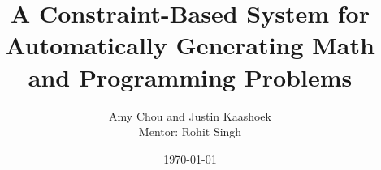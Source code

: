 \documentclass[11pt]{article}
\begin{document}
\title{A Constraint-Based System for Automatically Generating Math and Programming Problems}
\author{Amy Chou and Justin Kaashoek \\ Mentor: Rohit Singh}
\date{\today}

\begin{singlespace}
\maketitle
\end{singlespace}

\begin{abstract}

\end{abstract}

\newpage







\newpage




\newpage


\end{document}
